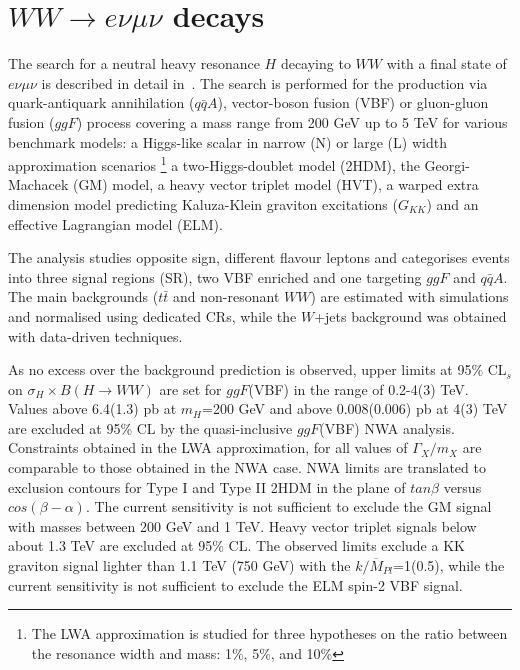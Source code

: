 \documentclass{PoS}
\begin{document}
\section{$WW\rightarrow e\nu \mu \nu$ decays}
\label{sec:WW}
The search for a neutral heavy resonance $H$ decaying to $WW$ with a final state of $e\nu \mu \nu$ is described in detail in~\cite{HIGG-2016-31}. 
The search is performed for the production via quark-antiquark annihilation ($q\bar{q}A$), vector-boson fusion (VBF) or gluon-gluon fusion ($ggF$) process covering a mass range from 200 GeV up to 5 TeV for various benchmark models: a Higgs-like scalar in narrow (N) or large (L) width approximation scenarios
\footnote{
The LWA approximation is studied for three hypotheses on the ratio between the resonance width and mass: 1\%, 5\%, and 10\% }
a two-Higgs-doublet model (2HDM), the Georgi-Machacek (GM) model, a heavy vector triplet model (HVT), a warped extra dimension model predicting  Kaluza-Klein graviton excitations ($G_{KK}$) and an effective Lagrangian model (ELM).

The analysis studies opposite sign, different flavour leptons and categorises events into three signal regions (SR), two VBF enriched and one targeting $ggF$ and $q\bar{q}A$. 
The main backgrounds ($t\bar{t}$ and non-resonant $WW$) are estimated with simulations  and normalised using dedicated CRs, while the $W$+jets background was obtained with data-driven techniques. 

As no excess over the background prediction is observed, upper limits at 95\% CL$_s$ on $\sigma_H \times B(H\rightarrow WW)$ are set for $ggF$(VBF) in the range of 0.2-4(3) TeV. 
Values above 6.4(1.3) pb at $m_H$=200 GeV and above 0.008(0.006) pb at 4(3) TeV are excluded at 95\% CL by the quasi-inclusive $ggF$(VBF) NWA analysis.
Constraints obtained in the LWA approximation, for all values of $\Gamma_X/m_X$ are comparable to those obtained in the NWA case.
NWA limits are translated to exclusion contours  for Type I and Type II 2HDM in the plane of $tan \beta$ versus $cos(\beta-\alpha)$.
The current sensitivity is not sufficient to exclude the GM signal with masses between 200 GeV and 1 TeV.
Heavy vector triplet signals below about 1.3 TeV are excluded at 95\% CL. 
The observed limits exclude a KK graviton signal lighter than 1.1 TeV (750 GeV) with the $k/\overline{M}_{Pl}$=1(0.5), while the current sensitivity is not sufficient to exclude the ELM spin-2 VBF signal. 
\end{document}
